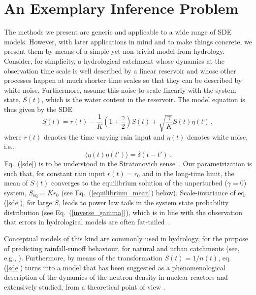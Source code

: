 \documentclass[12pt,a4paper,final]{iopart}
\newcommand{\eq}{\mbox{eq}}
\begin{document}
\section{An Exemplary Inference Problem}

The methods we present are generic and applicable to a wide range of SDE models.
However, with later applications in mind and to make things concrete, we present them by means of a simple yet non-trivial model from hydrology.
Consider, for simplicity, a hydrological catchment whose dynamics at the observation time scale is well described by a linear reservoir and whose other processes happen at much shorter time scales so that they can be described by white noise.
Furthermore, assume this noise to scale linearly with the system state, $S(t)$, which is the water content in the reservoir.
The model equation is thus given by the SDE
\begin{equation}\label{sde}
\dot{S}(t) = r(t) - \frac{1}{K}\left(1+\frac{\gamma}{2}\right) S(t)
+
\sqrt{\frac{\gamma}{K}} S(t){\eta}(t)\,,
\end{equation}
where $r(t)$ denotes the time varying rain input and $\eta(t)$ denotes white noise, i.e.,
\begin{equation}\label{whitenoise}
\langle\eta(t)\eta(t')\rangle = \delta(t-t')\,.
\end{equation}
Eq.~(\ref{sde}) is to be understood in the Stratonovich sense~\cite{stratonovich_1968}.
Our parametrization is such that, for constant rain input $r(t)=r_0$ and in the long-time limit, the mean of $S(t)$ converges to the equilibrium solution of the unperturbed ($\gamma=0$) system, $S_{\eq}=Kr_0$ (see Eq.~(\ref{equilibrium_mean}) below).
Scale-invariance of eq. (\ref{sde}), for large $S$, leads to power law tails in the system state probability distribution (see Eq.~(\ref{inverse_gamma})), which is in line with the observation that errors in hydrological models are often fat-tailed~\cite{thyer_2009_fattails}.

Conceptual models of this kind are commonly used in hydrology, for the purpose of predicting rainfall-runoff behaviour, for natural and urban catchments (see, e.g., \cite{breinholt_2011_SDE}).
Furthermore, by means of the transformation $S(t)=1/n(t)$, eq. (\ref{sde}) turns into a model that has been suggested as a phenomenological description of the dynamics of the neutron density in nuclear reactors \cite{dutre_1977_SDE} and extensively studied, from a theoretical point of view \cite{fujisaka_1986_intermittency}.
\end{document}

